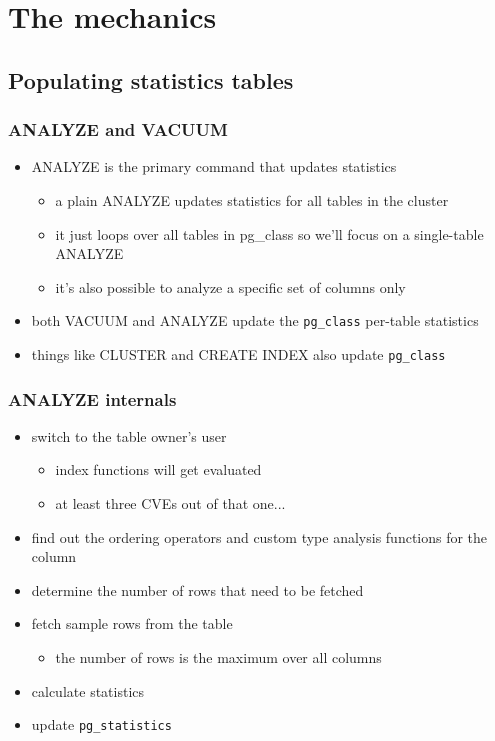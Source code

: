 \documentclass{beamer}
\begin{document}
\section{The mechanics}
\subsection{Populating statistics tables}

\begin{frame}
  \frametitle{ANALYZE and VACUUM}

  \begin{itemize}
  \item \alert{ANALYZE} is the primary command that updates statistics
    \begin{itemize}
    \item a plain ANALYZE updates statistics for \alert{all tables} in the cluster
    \item it just loops over all tables in pg\_class so we'll focus on a
      \alert{single-table} ANALYZE
    \item it's also possible to analyze a \alert{specific set of columns} only
    \end{itemize}
  \item both \alert{VACUUM} and \alert{ANALYZE} update the \texttt{pg\_class}
    per-table statistics
  \item things like \alert{CLUSTER} and \alert{CREATE INDEX} also update
    \texttt{pg\_class}
  \end{itemize}
\end{frame}

\begin{frame}
  \frametitle{ANALYZE internals}

  \begin{itemize}
  \item switch to the \alert{table owner's} user
    \begin{itemize}
    \item index functions will get evaluated
    \item at least \alert{three CVEs} out of that one...
    \end{itemize}
  \item find out the \alert{ordering operators} and \alert{custom type
    analysis} functions for the column
  \item determine the \alert{number of rows} that need to be fetched
  \item fetch \alert{sample rows} from the table
    \begin{itemize}
    \item the number of rows is the \alert{maximum} over all columns
    \end{itemize}
  \item \alert{calculate} statistics
  \item \alert{update} \texttt{pg\_statistics}
  \end{itemize}
\end{frame}
\end{document}
